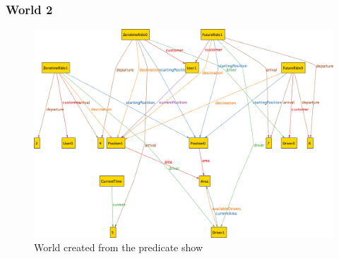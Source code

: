 \subsubsection{World 2}
\label{w2}
\begin{figure}[h!]
	\centerline{\includegraphics[scale=0.92, angle=90]{./figures/ALLOY_AModelOfTheWorld.png}}
	\caption{World created from the predicate show}
	\label{w2fig}
\end{figure}


	\label{aw2}


	\label{aw3}

